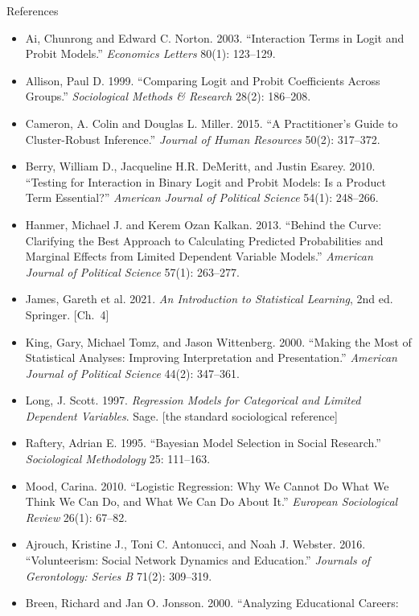 \documentclass[aspectratio=169,11pt,xcolor=dvipsnames]{beamer}
\begin{document}
\begin{frame}[allowframebreaks,t]{References}
\footnotesize
\begin{itemize}\itemsep3pt
\item Ai, Chunrong and Edward C. Norton. 2003. ``Interaction Terms in Logit and
Probit Models.'' \textit{Economics Letters} 80(1): 123--129.
\item Allison, Paul D. 1999. ``Comparing Logit and Probit Coefficients Across
Groups.'' \textit{Sociological Methods \& Research} 28(2): 186--208.
\item Cameron, A. Colin and Douglas L. Miller. 2015. ``A Practitioner's Guide
to Cluster-Robust Inference.'' \textit{Journal of Human Resources} 50(2):
317--372.
\item Berry, William D., Jacqueline H.R. DeMeritt, and Justin Esarey. 2010.
``Testing for Interaction in Binary Logit and Probit Models: Is a Product Term
Essential?'' \textit{American Journal of Political Science} 54(1): 248--266.
\item Hanmer, Michael J. and Kerem Ozan Kalkan. 2013. ``Behind the Curve:
Clarifying the Best Approach to Calculating Predicted Probabilities and Marginal
Effects from Limited Dependent Variable Models.''
\textit{American Journal of Political Science} 57(1): 263--277.
\item James, Gareth et al. 2021. \textit{An Introduction to Statistical Learning},
2nd ed. Springer. [Ch.\ 4]
\item King, Gary, Michael Tomz, and Jason Wittenberg. 2000. ``Making the Most of
Statistical Analyses: Improving Interpretation and Presentation.''
\textit{American Journal of Political Science} 44(2): 347--361.
\item Long, J. Scott. 1997. \textit{Regression Models for Categorical and Limited
Dependent Variables}. Sage. [the standard sociological reference]
\item Raftery, Adrian E. 1995. ``Bayesian Model Selection in Social
Research.'' \textit{Sociological Methodology} 25: 111--163.
\item Mood, Carina. 2010. ``Logistic Regression: Why We Cannot Do What We Think We
Can Do, and What We Can Do About It.'' \textit{European Sociological Review}
26(1): 67--82.
\item Ajrouch, Kristine J., Toni C. Antonucci, and Noah J. Webster. 2016.
``Volunteerism: Social Network Dynamics and Education.'' \textit{Journals of
Gerontology: Series B} 71(2): 309--319.
\item Breen, Richard and Jan O. Jonsson. 2000. ``Analyzing Educational Careers:

\end{itemize}
\end{frame}
\end{document}
